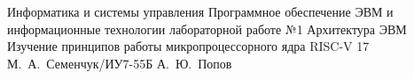 \documentclass{bmstu}
\begin{document}
\makereporttitle
    {Информатика и системы управления}
    {Программное обеспечение ЭВМ и информационные технологии}
    {лабораторной работе №1}
    {Архитектура ЭВМ}
    {Изучение принципов работы микропроцессорного ядра RISC-V}
    {17}
    {М.~А.~Семенчук/ИУ7-55Б}
    {А.~Ю.~Попов}

\maketableofcontents








\makebibliography


\end{document}
